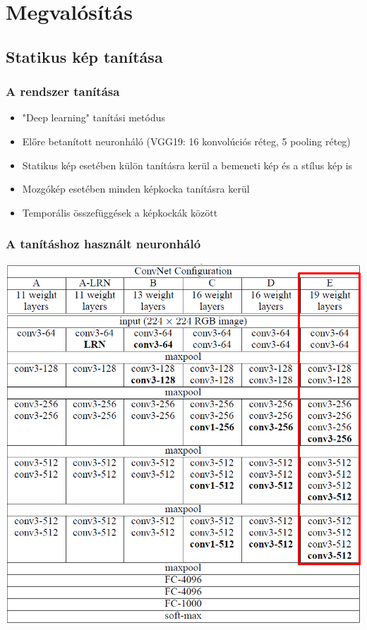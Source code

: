 \documentclass{beamer}
\begin{document}
	\section{Megvalósítás}
	\subsection{Statikus kép tanítása}
	
	\begin{frame}
		\frametitle{A rendszer tanítása}
		\begin{itemize}
			\item "Deep learning" tanítási metódus
			\item Előre betanított neuronháló (VGG19: 16 konvolúciós réteg, 5 pooling réteg)
			\item Statikus kép esetében külön tanításra kerül a bemeneti kép és a stílus kép is
			\item Mozgókép esetében minden képkocka tanításra kerül
			\item Temporális összefüggések a képkockák között
		\end{itemize}
	\end{frame}
	
	\begin{frame}
		\frametitle{A tanításhoz használt neuronháló}
		\begin{center}
			\includegraphics[scale=0.2]{VGG19.png}
		\end{center}
	\end{frame}
\end{document}
